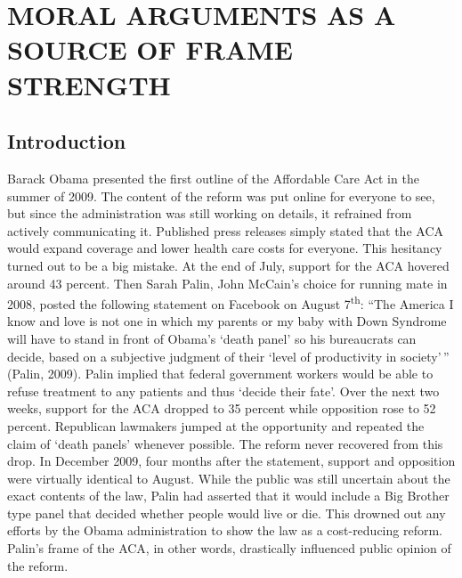 \documentclass[12pt,econ]{sources/authesis}
\begin{document}
\hypertarget{framing}{%
\chapter{MORAL ARGUMENTS AS A SOURCE OF FRAME STRENGTH}\label{framing}}

\hypertarget{framing-intro}{%
\section{Introduction}\label{framing-intro}}

Barack Obama presented the first outline of the Affordable Care Act in the summer of 2009. The content of the reform was put online for everyone to see, but since the administration was still working on details, it refrained from actively communicating it. Published press releases simply stated that the ACA would expand coverage and lower health care costs for everyone. This hesitancy turned out to be a big mistake. At the end of July, support for the ACA hovered around 43 percent. Then Sarah Palin, John McCain's choice for running mate in 2008, posted the following statement on Facebook on August 7\textsuperscript{th}: ``The America I know and love is not one in which my parents or my baby with Down Syndrome will have to stand in front of Obama's `death panel' so his bureaucrats can decide, based on a subjective judgment of their `level of productivity in society'\,'' (Palin, 2009). Palin implied that federal government workers would be able to refuse treatment to any patients and thus `decide their fate'. Over the next two weeks, support for the ACA dropped to 35 percent while opposition rose to 52 percent. Republican lawmakers jumped at the opportunity and repeated the claim of `death panels' whenever possible. The reform never recovered from this drop. In December 2009, four months after the statement, support and opposition were virtually identical to August. While the public was still uncertain about the exact contents of the law, Palin had asserted that it would include a Big Brother type panel that decided whether people would live or die. This drowned out any efforts by the Obama administration to show the law as a cost-reducing reform. Palin's frame of the ACA, in other words, drastically influenced public opinion of the reform.
\end{document}
